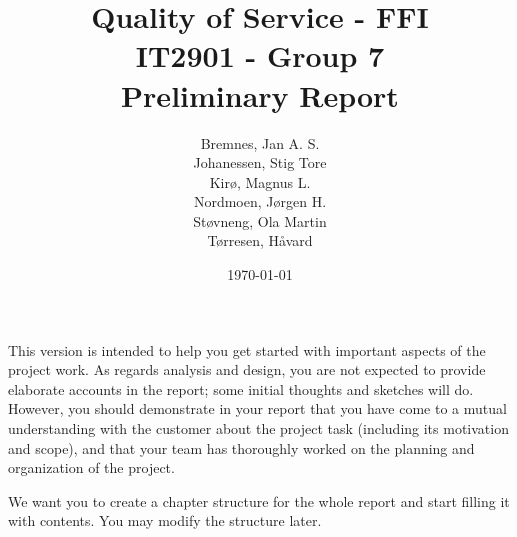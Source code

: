\documentclass[12pt]{article}
\title{
    Quality of Service - FFI \\
    IT2901 - Group 7  \\ 
    Preliminary Report \\
}
\author{
    Bremnes, Jan A. S. \\  
    Johanessen, Stig Tore \\
    Kirø, Magnus L.\\
    Nordmoen, Jørgen H.\\ 
    Støvneng, Ola Martin  \\
    Tørresen, Håvard \\
}
\date{\today}
\begin{document}
\maketitle
\titlepage
{}

\begin{should contain}
    This version is intended to help you get started with important aspects of the project work. As regards analysis and design, you are not expected to provide elaborate accounts in the report; some initial thoughts and sketches will do. However, you should demonstrate in your report that you have come to a mutual understanding with the customer about the project task (including its motivation and scope), and that your team has thoroughly worked on the planning and organization of the project. 

    We want you to create a chapter structure for the whole report and start filling it with contents. You may modify the structure later. 


\end{should contain}
\end{document}
